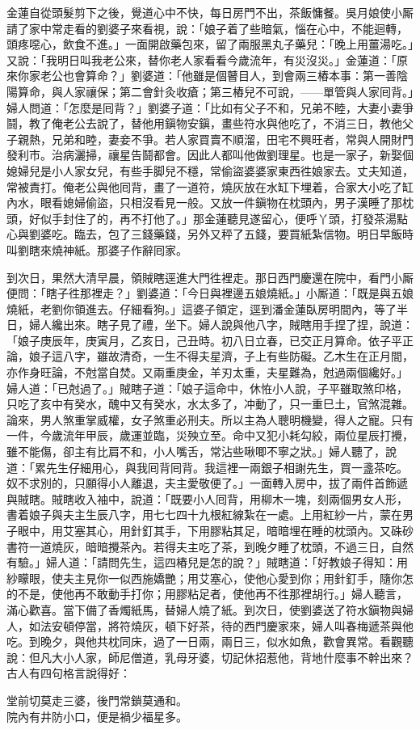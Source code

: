 金蓮自從頭髮剪下之後，覺道心中不快，每日房門不出，茶飯慵餐。吳月娘使小厮請了家中常走看的劉婆子來看視，說：「娘子着了些暗氣，惱在心中，不能迴轉，頭疼噁心，飲食不進。」一面開啟藥包來，留了兩服黑丸子藥兒：「晚上用薑湯吃。」又說：「我明日叫我老公來，替你老人家看看今歲流年，有災沒災。」金蓮道：「原來你家老公也會算命？」劉婆道：「他雖是個瞽目人，到會兩三樁本事：第一善陰陽算命，與人家禳保；第二會針灸收瘡；第三樁兒不可說，{}——單管與人家囘背。」婦人問道：「怎麼是囘背？」劉婆子道：「比如有父子不和，兄弟不睦，{}大妻小妻爭鬪，教了俺老公去說了，替他用鎭物安鎭，畫些符水與他吃了，不消三日，教他父子親熱，兄弟和睦，妻妾不爭。若人家買賣不順溜，田宅不興旺者，{}常與人開財門發利市。治病灑掃，禳星告鬪都會。因此人都叫他做劉理星。也是一家子，新娶個媳婦兒是小人家女兒，有些手脚兒不穩，常偷盜婆婆家東西徃娘家去。丈夫知道，常被責打。俺老公與他囘背，畫了一道符，燒灰放在水缸下埋着，合家大小吃了缸內水，眼看媳婦偷盜，只相沒看見一般。{}又放一件鎭物在枕頭內，男子漢睡了那枕頭，好似手封住了的，再不打他了。」那金蓮聽見遂留心，便呼丫頭，打發茶湯點心與劉婆吃。臨去，包了三錢藥錢，另外又秤了五錢，要買紙紮信物。明日早飯時叫劉瞎來燒神紙。那婆子作辭囘家。

到次日，果然大清早晨，領賊瞎逕進大門徃裡走。那日西門慶還在院中，看門小厮便問：「瞎子徃那裡走？」劉婆道：「今日與裡邊五娘燒紙。」小厮道：「既是與五娘燒紙，老劉你領進去。仔細看狗。」這婆子領定，逕到潘金蓮臥房明間內，等了半日，婦人纔出來。瞎子見了禮，坐下。婦人說與他八字，賊瞎用手捏了捏，說道：「娘子庚辰年，庚寅月，乙亥日，己丑時。初八日立春，已交正月算命。依子平正論，娘子這八字，雖故清奇，一生不得夫星濟，子上有些防礙。乙木生在正月間，亦作身旺論，不尅當自焚。又兩重庚金，羊刃太重，夫星難為，尅過兩個纔好。」婦人道：「已尅過了。」賊瞎子道：「娘子這命中，休恠小人說，子平雖取煞印格，只吃了亥中有癸水，醜中又有癸水，水太多了，冲動了，只一重巳土，官煞混雜。論來，男人煞重掌威權，女子煞重必刑夫。所以主為人聰明機變，得人之寵。只有一件，今歲流年甲辰，歲運並臨，災殃立至。命中又犯小耗勾絞，兩位星辰打攪，雖不能傷，卻主有比肩不和，小人嘴舌，常沾些啾唧不寧之狀。」婦人聽了，說道：「累先生仔細用心，與我囘背囘背。我這裡一兩銀子相謝先生，買一盞茶吃。奴不求別的，只願得小人離退，夫主愛敬便了。」一面轉入房中，拔了兩件首飾遞與賊瞎。賊瞎收入袖中，說道：「既要小人囘背，用柳木一塊，刻兩個男女人形，書着娘子與夫主生辰八字，用七七四十九根紅線紮在一處。上用紅紗一片，蒙在男子眼中，用艾塞其心，用針釘其手，下用膠粘其足，暗暗埋在睡的枕頭內。又硃砂書符一道燒灰，暗暗攪茶內。若得夫主吃了茶，到晚夕睡了枕頭，不過三日，自然有驗。」婦人道：「請問先生，這四樁兒是怎的說？」賊瞎道：「好教娘子得知：用紗矇眼，使夫主見你一似西施嬌艷；用艾塞心，使他心愛到你；用針釘手，隨你怎的不是，使他再不敢動手打你；用膠粘足者，使他再不徃那裡胡行。」{}婦人聽言，滿心歡喜。當下備了香燭紙馬，替婦人燒了紙。到次日，使劉婆送了符水鎭物與婦人，如法安頓停當，將符燒灰，頓下好茶，待的西門慶家來，婦人叫春梅遞茶與他吃。到晚夕，與他共枕同床，過了一日兩，兩日三，似水如魚，歡會異常。看觀聽說：但凡大小人家，師尼僧道，乳母牙婆，切記休招惹他，背地什麼事不幹出來？古人有四句格言說得好：

\begin{myquote}
堂前切莫走三婆，後門常鎖莫通和。\\院內有井防小口，便是禍少福星多。
\end{myquote}

